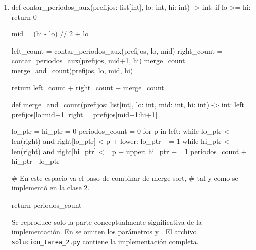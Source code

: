 \begin{enumerate}
\begin{enumerate}
    \medskip
    Sin embargo, la solución clásica del problema define una función $f$ como $f(k) = \sum_{i=1}^k c_i$. Es decir: \(f\) computa la suma acumulada de los primeros $k$ elementos.

    \medskip
    Si se usa esa función como arreglo, es decir, se define un arreglo  donde  corresponde a \(f(i)\), en ese arreglo, el cambio acumulado del periodo de días desde $i+1$ hasta $j$ es 

    \medskip
    Con esa transformación es simple calcular el cambio acumulado de cualquier periodo de días usando un par de índices \(i, j\), por lo cual es sencillo relacionar la solución al problema de pares invertidos. Como vimos en la corrección del quiz 1 en la clase 3, una solución a ese problema consiste en añadir unas pocas lineas a merge sort.
  \end{enumerate}

  \item
  \leavevmode
  \begin{pseudocode}
def contar_periodos_aux(prefijos: list[int], lo: int, hi: int) -> int:
    if lo >= hi: return 0

    mid = (hi - lo) // 2 + lo

    left_count = contar_periodos_aux(prefijos, lo, mid)
    right_count = contar_periodos_aux(prefijos, mid+1, hi)
    merge_count = merge_and_count(prefijos, lo, mid, hi)

    return left_count + right_count + merge_count


def merge_and_count(prefijos: list[int], lo: int, mid: int, hi: int) -> int:
    left = prefijos[lo:mid+1]
    right = prefijos[mid+1:hi+1]

    lo_ptr = hi_ptr = 0
    periodos_count = 0
    for p in left:
        while lo_ptr < len(right) and right[lo_ptr] < p + lower:
            lo_ptr += 1
        while hi_ptr < len(right) and right[hi_ptr] <= p + upper:
            hi_ptr += 1
        periodos_count += hi_ptr - lo_ptr

    # En este espacio va el paso de combinar de merge sort,
    # tal y como se implementó en la clase 2.

    return periodos_count
  \end{pseudocode}

  {\small Se reproduce solo la parte conceptualmente significativa de la implementación. En  se omiten los parámetros  y . El archivo \texttt{solucion\_tarea\_2.py} contiene la implementación completa.}
\end{enumerate}
